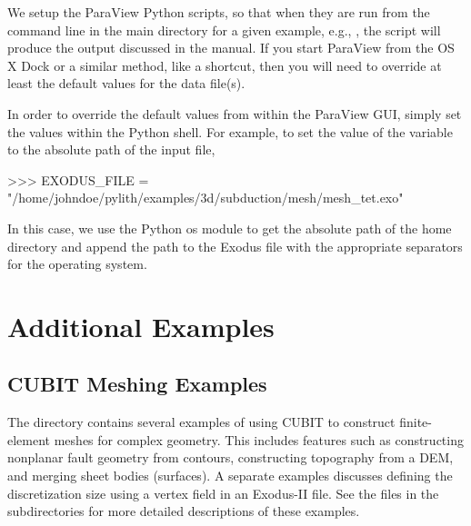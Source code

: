 We setup the ParaView Python scripts, so that when they are run from
the command line in the main directory for a given example, e.g.,
, the script will produce the output
discussed in the manual. If you start ParaView from the OS X Dock or a
similar method, like a shortcut, then you will need to override at
least the default values for the data file(s).

In order to override the default values from within the ParaView GUI,
simply set the values within the Python shell. For example, to set the
value of the variable  to the absolute path of
the input file,
\begin{python}
>>> EXODUS_FILE = "/home/johndoe/pylith/examples/3d/subduction/mesh/mesh_tet.exo"
\end{python}
In this case, we use the Python os module to get the absolute path of
the home directory and append the path to the Exodus file with the
appropriate separators for the operating system.








%


%


\section{Additional Examples}


\subsection{CUBIT Meshing Examples}

The directory  contains several examples
of using CUBIT to construct finite-element meshes for complex geometry.
This includes features such as constructing nonplanar fault geometry
from contours, constructing topography from a DEM, and merging sheet
bodies (surfaces). A separate examples discusses defining the discretization
size using a vertex field in an Exodus-II file. See the 
files in the subdirectories for more detailed descriptions of these
examples.


